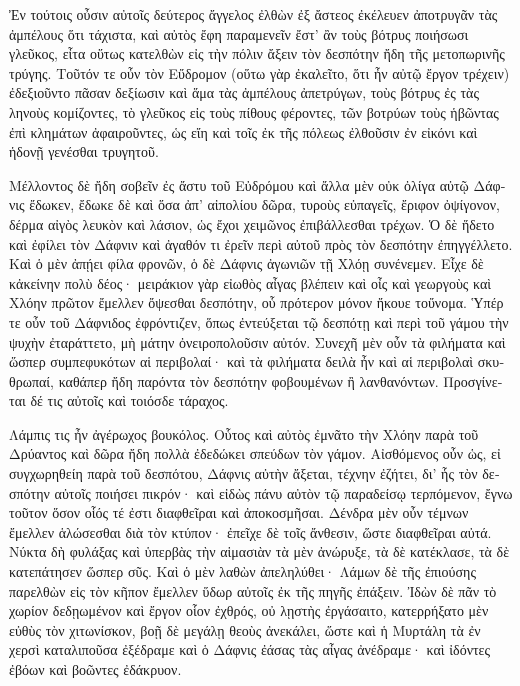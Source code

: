 \documentclass{book}
\begin{document}
\begin{pairs}
\begin{Leftside}
\begin{greek}
  Ἐν τούτοις οὖσιν αὐτοῖς δεύτερος ἄγγελος ἐλθὼν ἐξ ἄστεος ἐκέλευεν ἀποτρυγᾶν τὰς ἀμπέλους ὅτι τάχιστα, καὶ αὐτὸς ἔφη παραμενεῖν ἔστ’ ἂν τοὺς βότρυς ποιήσωσι γλεῦκος, εἶτα οὕτως κατελθὼν εἰς τὴν πόλιν ἄξειν τὸν δεσπότην ἤδη τῆς μετοπωρινῆς τρύγης.  Τοῦτόν τε οὖν τὸν Εὔδρομον (οὕτω γὰρ ἐκαλεῖτο, ὅτι ἦν αὐτῷ ἔργον τρέχειν) ἐδεξιοῦντο πᾶσαν δεξίωσιν καὶ ἅμα τὰς ἀμπέλους ἀπετρύγων, τοὺς βότρυς ἐς τὰς ληνοὺς κομίζοντες, τὸ γλεῦκος εἰς τοὺς πίθους φέροντες, τῶν βοτρύων τοὺς ἡβῶντας ἐπὶ κλημάτων ἀφαιροῦντες, ὡς εἴη καὶ τοῖς ἐκ τῆς πόλεως ἐλθοῦσιν ἐν εἰκόνι καὶ ἡδονῇ γενέσθαι τρυγητοῦ.
\pend


  Μέλλοντος δὲ ἤδη σοβεῖν ἐς ἄστυ τοῦ Εὐδρόμου καὶ ἄλλα μὲν οὐκ ὀλίγα αὐτῷ Δάφνις ἔδωκεν, ἔδωκε δὲ καὶ ὅσα ἀπ’ αἰπολίου δῶρα, τυροὺς εὐπαγεῖς, ἔριφον ὀψίγονον, δέρμα αἰγὸς λευκὸν καὶ λάσιον, ὡς ἔχοι χειμῶνος ἐπιβάλλεσθαι τρέχων.  Ὁ δὲ ἥδετο καὶ ἐφίλει τὸν Δάφνιν καὶ ἀγαθόν τι ἐρεῖν περὶ αὐτοῦ πρὸς τὸν δεσπότην ἐπηγγέλλετο. Καὶ ὁ μὲν ἀπῄει φίλα φρονῶν, ὁ δὲ Δάφνις ἀγωνιῶν τῇ Χλόῃ συνένεμεν. Εἶχε δὲ κἀκείνην πολὺ δέος· μειράκιον γὰρ εἰωθὸς αἶγας βλέπειν καὶ οἶς καὶ γεωργοὺς καὶ Χλόην πρῶτον ἔμελλεν ὄψεσθαι δεσπότην, οὗ πρότερον μόνον ἤκουε τοὔνομα.  Ὑπέρ τε οὖν τοῦ Δάφνιδος ἐφρόντιζεν, ὅπως ἐντεύξεται τῷ δεσπότῃ καὶ περὶ τοῦ γάμου τὴν ψυχὴν ἐταράττετο, μὴ μάτην ὀνειροπολοῦσιν αὐτόν. Συνεχῆ μὲν οὖν τὰ φιλήματα καὶ ὥσπερ συμπεφυκότων αἱ περιβολαί· καὶ τὰ φιλήματα δειλὰ ἦν καὶ αἱ περιβολαὶ σκυθρωπαί, καθάπερ ἤδη παρόντα τὸν δεσπότην φοβουμένων ἢ λανθανόντων. Προσγίνεται δέ τις αὐτοῖς καὶ τοιόσδε τάραχος.
\pend


  Λάμπις τις ἦν ἀγέρωχος βουκόλος. Οὗτος καὶ αὐτὸς ἐμνᾶτο τὴν Χλόην παρὰ τοῦ Δρύαντος καὶ δῶρα ἤδη πολλὰ ἐδεδώκει σπεύδων τὸν γάμον.  Αἰσθόμενος οὖν ὡς, εἰ συγχωρηθείη παρὰ τοῦ δεσπότου, Δάφνις αὐτὴν ἄξεται, τέχνην ἐζήτει, δι’ ἧς τὸν δεσπότην αὐτοῖς ποιήσει πικρόν· καὶ εἰδὼς πάνυ αὐτὸν τῷ παραδείσῳ τερπόμενον, ἔγνω τοῦτον ὅσον οἷός τέ ἐστι διαφθεῖραι καὶ ἀποκοσμῆσαι.  Δένδρα μὲν οὖν τέμνων ἔμελλεν ἁλώσεσθαι διὰ τὸν κτύπον· ἐπεῖχε δὲ τοῖς ἄνθεσιν, ὥστε διαφθεῖραι αὐτά. Νύκτα δὴ φυλάξας καὶ ὑπερβὰς τὴν αἱμασιὰν τὰ μὲν ἀνώρυξε, τὰ δὲ κατέκλασε,  τὰ δὲ κατεπάτησεν ὥσπερ σῦς. Καὶ ὁ μὲν λαθὼν ἀπεληλύθει· Λάμων δὲ τῆς ἐπιούσης παρελθὼν εἰς τὸν κῆπον ἔμελλεν ὕδωρ αὐτοῖς ἐκ τῆς πηγῆς ἐπάξειν.  Ἰδὼν δὲ πᾶν τὸ χωρίον δεδῃωμένον καὶ ἔργον οἷον ἐχθρός, οὐ λῃστὴς ἐργάσαιτο, κατερρήξατο μὲν εὐθὺς τὸν χιτωνίσκον, βοῇ δὲ μεγάλῃ θεοὺς ἀνεκάλει, ὥστε καὶ ἡ Μυρτάλη τὰ ἐν χερσὶ καταλιποῦσα ἐξέδραμε καὶ ὁ Δάφνις ἐάσας τὰς αἶγας ἀνέδραμε· καὶ ἰδόντες ἐβόων καὶ βοῶντες ἐδάκρυον.
\pend



\end{greek}
\end{Leftside}
\end{pairs}
\end{document}

